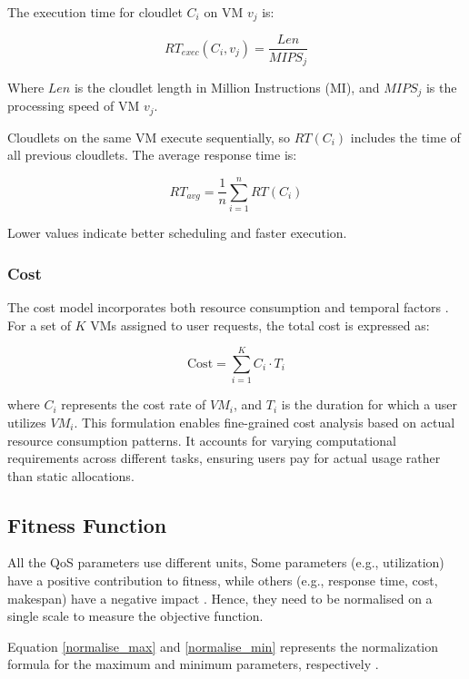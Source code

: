 \documentclass[pdflatex,sn-mathphys-num]{sn-jnl}%
\theoremstyle{thmstyleone}%
\theoremstyle{thmstyletwo}%
\theoremstyle{thmstylethree}%
\begin{document}
The execution time for cloudlet $C_i$ on VM $v_j$ is:

\begin{equation} \label{eq6}
RT_{exec}(C_i, v_j) = \frac{Len}{MIPS_j}
\end{equation}

Where $Len$ is the cloudlet length in Million Instructions (MI), and $MIPS_j$ is the processing speed of VM $v_j$.

Cloudlets on the same VM execute sequentially, so $RT(C_i)$ includes the time of all previous cloudlets. The average response time is:

\begin{equation} \label{eq7}
RT_{avg} = \frac{1}{n} \sum_{i=1}^{n} RT(C_i)
\end{equation}

Lower values indicate better scheduling and faster execution.


\subsubsection{Cost}\label{subsubsec3.2.4}

The cost model incorporates both resource consumption and temporal factors \cite{bib9}. For a set of \( K \) VMs assigned to user requests, the total cost is expressed as:

\begin{equation} \label{eq8}
\text{Cost} = \sum_{i=1}^{K} C_i \cdot T_i
\end{equation}

where \( C_i \) represents the cost rate of \( VM_i \), and \( T_i \) is the duration for which a user utilizes \( VM_i \). This formulation enables fine-grained cost analysis based on actual resource consumption patterns. It accounts for varying computational requirements across different tasks, ensuring users pay for actual usage rather than static allocations.

\subsection{Fitness Function}\label{subsec3.3}
All the QoS parameters use different units, Some parameters (e.g., utilization) have a positive contribution to fitness, while others (e.g., response time, cost, makespan) have a negative impact \cite{bib9}. Hence, they need to be normalised on a single scale to measure the objective function.

Equation \ref{normalise_max} and \ref{normalise_min} represents the normalization formula for the maximum and minimum parameters, respectively \cite{normalise-HB-cloud-paper}.
\end{document}
